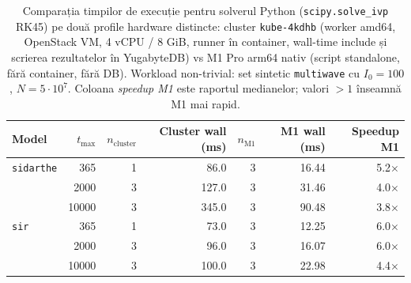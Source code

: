 \begin{table}[!htbp]
\centering
\caption[Comparare hardware M1 vs cluster]{Comparația timpilor de execuție pentru solverul Python (\texttt{scipy.solve\_ivp} RK45) pe două profile hardware distincte: cluster \texttt{kube-4kdhb} (worker amd64, OpenStack VM, 4 vCPU / 8 GiB, runner în container, wall-time include și scrierea rezultatelor în YugabyteDB) vs M1 Pro arm64 nativ (script standalone, fără container, fără DB). Workload non-trivial: set sintetic \texttt{multiwave} cu $I_0 = 100$, $N = 5 \cdot 10^7$. Coloana \emph{speedup M1} este raportul medianelor; valori $>1$ înseamnă M1 mai rapid.}
\label{tab:hardware_comparison}
\begin{tabularx}{\textwidth}{l r r r r r r}
\toprule
\textbf{Model} & \textbf{$t_{\max}$} & \textbf{$n_{\mathrm{cluster}}$} & \textbf{Cluster wall (ms)} & \textbf{$n_{\mathrm{M1}}$} & \textbf{M1 wall (ms)} & \textbf{Speedup M1} \\
\midrule
\texttt{sidarthe} & 365 & 1 & 86.0 & 3 & 16.44 & 5.2$\times$ \\
 & 2000 & 3 & 127.0 & 3 & 31.46 & 4.0$\times$ \\
 & 10000 & 3 & 345.0 & 3 & 90.48 & 3.8$\times$ \\
\texttt{sir} & 365 & 1 & 73.0 & 3 & 12.25 & 6.0$\times$ \\
 & 2000 & 3 & 96.0 & 3 & 16.07 & 6.0$\times$ \\
 & 10000 & 3 & 100.0 & 3 & 22.98 & 4.4$\times$ \\
\bottomrule
\end{tabularx}
\end{table}
